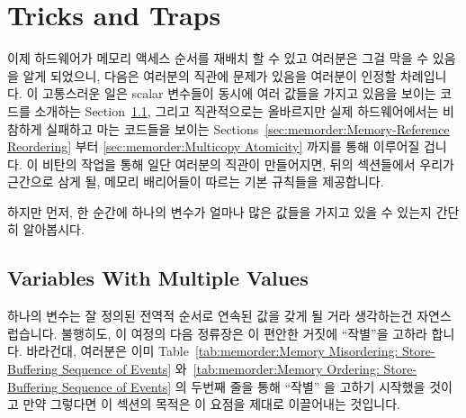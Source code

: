 \section{Tricks and Traps}
\label{sec:memorder:Tricks and Traps}

이제 하드웨어가 메모리 액세스 순서를 재배치 할 수 있고 여러분은 그걸 막을 수
있음을 알게 되었으니, 다음은 여러분의 직관에 문제가 있음을 여러분이 인정할
차례입니다.
이 고통스러운 일은 scalar 변수들이 동시에 여러 값들을 가지고 있음을 보이는
코드를 소개하는
Section~\ref{sec:memorder:Variables With Multiple Values}, 그리고
직관적으로는 올바르지만 실제 하드웨어에서는 비참하게 실패하고 마는 코드들을
보이는
Sections~\ref{sec:memorder:Memory-Reference Reordering} 부터
\ref{sec:memorder:Multicopy Atomicity} 까지를 통해 이루어질 겁니다.
이 비탄의 작업을 통해 일단 여러분의 직관이 만들어지면, 뒤의 섹션들에서 우리가
근간으로 삼게 될, 메모리 배리어들이 따르는 기본 규칙들을 제공합니다.

하지만 먼저, 한 순간에 하나의 변수가 얼마나 많은 값들을 가지고 있을 수 있는지
간단히 알아봅시다.

\subsection{Variables With Multiple Values}
\label{sec:memorder:Variables With Multiple Values}

하나의 변수는 잘 정의된 전역적 순서로 연속된 값을 갖게 될 거라 생각하는건
자연스럽습니다.
불행히도, 이 여정의 다음 정류장은 이 편안한 거짓에 ``작별''을 고하라 합니다.
바라건대, 여러분은 이미
Table~\ref{tab:memorder:Memory Misordering: Store-Buffering Sequence of Events}
와~\ref{tab:memorder:Memory Ordering: Store-Buffering Sequence of Events} 의
두번째 줄을 통해 ``작별'' 을 고하기 시작했을 것이고 만약 그렇다면 이 섹션의
목적은 이 요점을 제대로 이끌어내는 것입니다.
\iffalse

